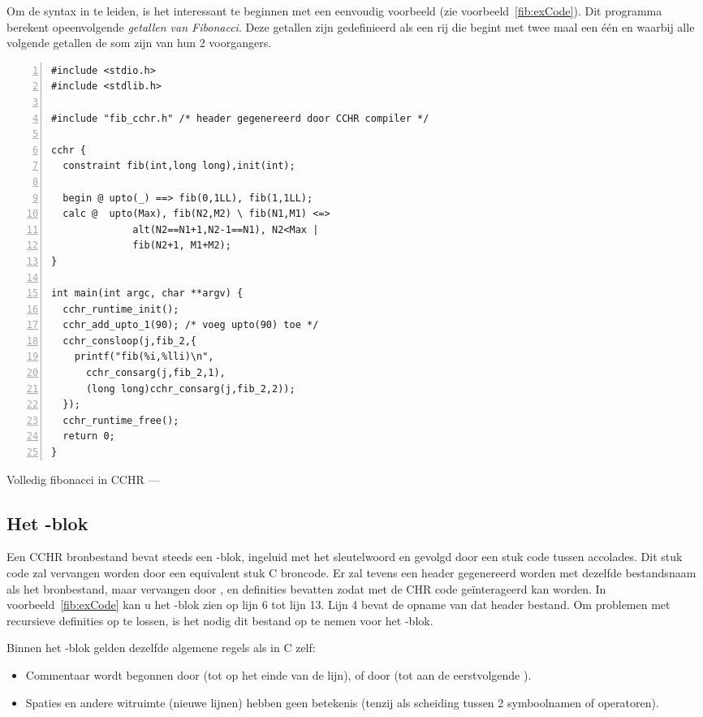 Om de syntax in te leiden, is het interessant te beginnen met een eenvoudig voorbeeld (zie voorbeeld~\ref{fib:exCode}). Dit programma berekent opeenvolgende {\em getallen van Fibonacci}. Deze getallen zijn gedefinieerd als een rij die begint met twee maal een \'e\'en en waarbij alle volgende getallen de som zijn van hun 2 voorgangers.

\begin{exCode}
\begin{Verbatim}[frame=single,numbers=left]
#include <stdio.h>
#include <stdlib.h>

#include "fib_cchr.h" /* header gegenereerd door CCHR compiler */

cchr {
  constraint fib(int,long long),init(int);

  begin @ upto(_) ==> fib(0,1LL), fib(1,1LL);
  calc @  upto(Max), fib(N2,M2) \ fib(N1,M1) <=>
              alt(N2==N1+1,N2-1==N1), N2<Max |
              fib(N2+1, M1+M2);
}

int main(int argc, char **argv) {
  cchr_runtime_init();
  cchr_add_upto_1(90); /* voeg upto(90) toe */
  cchr_consloop(j,fib_2,{
    printf("fib(%i,%lli)\n", 
      cchr_consarg(j,fib_2,1),
      (long long)cchr_consarg(j,fib_2,2));
  });
  cchr_runtime_free();
  return 0;
}
\end{Verbatim}
\caption{\label{fib:exCode} Volledig fibonacci in CCHR --- }
\end{exCode}

\subsection{Het -blok}

Een CCHR bronbestand bevat steeds een -blok, ingeluid met het sleutelwoord  en gevolgd door een stuk code tussen accolades. Dit stuk code zal vervangen worden door een equivalent stuk C broncode. Er zal tevens een header gegenereerd worden met dezelfde bestandsnaam als het bronbestand, maar  vervangen door , en definities bevatten zodat met de CHR code ge\"interageerd kan worden. In voorbeeld~\ref{fib:exCode} kan u het -blok zien op lijn 6 tot lijn 13. Lijn 4 bevat de opname van dat header bestand. Om problemen met recursieve definities op te lossen, is het nodig dit bestand op te nemen voor het -blok.

Binnen het -blok gelden dezelfde algemene regels als in C zelf: \begin{itemize}
  \item Commentaar wordt begonnen door \code{//} (tot op het einde van de lijn), of door \code{/*} (tot aan de eerstvolgende \code{*/}).
  \item Spaties en andere witruimte (nieuwe lijnen) hebben geen betekenis (tenzij als scheiding tussen 2 symboolnamen of operatoren).
\end{itemize}

